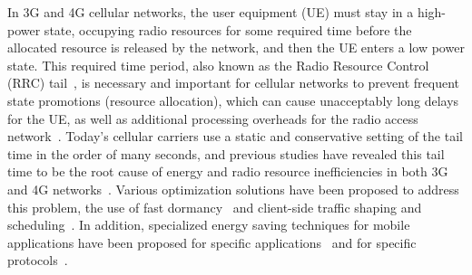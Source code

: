 In 3G and 4G cellular networks, the user equipment (UE) must stay in a high-power state, occupying radio resources for some required time before the allocated resource is released by the network, and then the UE enters a low power state. This required time period, also known as the Radio Resource Control (RRC) tail~\cite{imc.tailender}, is necessary and important for cellular networks to prevent frequent state promotions (resource allocation), which can cause unacceptably long delays for the UE, as well as additional processing overheads for the radio access network~\cite{poor, infocom_lee}. Today's cellular carriers use a static and conservative setting of the tail time in the order of many seconds, and previous studies have revealed this tail time to be the root cause of energy and radio resource inefficiencies in both 3G~\cite{imc.3g, imc.tailender, wts04, Chuah:Impacts:WCNC2002} and 4G networks~\cite{huang12_mobisys}. Various optimization solutions have been proposed to address this problem, \eg the use of fast dormancy~\cite{fast.dormancy.1, fast.dormancy.2, qian10_icnp} and client-side traffic shaping and scheduling~\cite{qian12_www, mobisys10_ra, imc.tailender}. In addition, specialized energy saving techniques for mobile applications have been proposed for specific applications~\cite{mobisys09_wang, mobisys08_kang} and for specific protocols~\cite{mobisys07_agarwal}.



